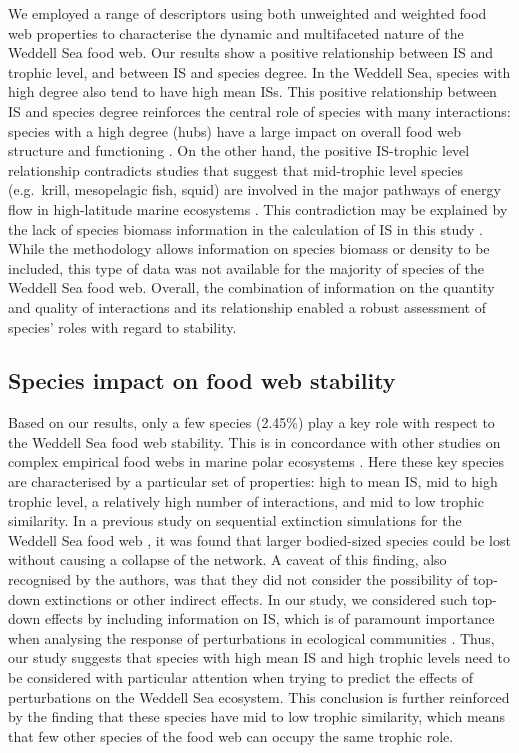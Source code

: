\documentclass[gc, manuscript]{copernicus}
\begin{document}
We employed a range of descriptors using both unweighted and weighted
food web properties to characterise the dynamic and multifaceted nature
of the Weddell Sea food web. Our results show a positive relationship
between IS and trophic level, and between IS and species degree. In the
Weddell Sea, species with high degree also tend to have high mean ISs.
This positive relationship between IS and species degree reinforces the
central role of species with many interactions: species with a high
degree (hubs) have a large impact on overall food web structure and
functioning \citep{Dunne2002a, Kortsch2015}. On the other hand, the
positive IS-trophic level relationship contradicts studies that suggest
that mid-trophic level species (e.g.~krill, mesopelagic fish, squid) are
involved in the major pathways of energy flow in high-latitude marine
ecosystems
\citep{Pinkerton2014, Murphy2016, McCormack2020, Riccialdelli2020}. This
contradiction may be explained by the lack of species biomass
information in the calculation of IS in this study \citep{Pawar2012}.
While the methodology allows information on species biomass or density
to be included, this type of data was not available for the majority of
species of the Weddell Sea food web. Overall, the combination of
information on the quantity and quality of interactions and its
relationship enabled a robust assessment of species' roles with regard
to stability.

\subsection{Species impact on food web stability}

Based on our results, only a few species (2.45\%) play a key role with
respect to the Weddell Sea food web stability. This is in concordance
with other studies on complex empirical food webs in marine polar
ecosystems \citep{Kortsch2015, Marina2018, Rodriguez2022}. Here these
key species are characterised by a particular set of properties: high to
mean IS, mid to high trophic level, a relatively high number of
interactions, and mid to low trophic similarity. In a previous study on
sequential extinction simulations for the Weddell Sea food web
\citep{Jacob2011}, it was found that larger bodied-sized species could
be lost without causing a collapse of the network. A caveat of this
finding, also recognised by the authors, was that they did not consider
the possibility of top-down extinctions or other indirect effects. In
our study, we considered such top-down effects by including information
on IS, which is of paramount importance when analysing the response of
perturbations in ecological communities
\citep{McCann1998, Montoya2009, Novak2011}. Thus, our study suggests
that species with high mean IS and high trophic levels need to be
considered with particular attention when trying to predict the effects
of perturbations on the Weddell Sea ecosystem. This conclusion is
further reinforced by the finding that these species have mid to low
trophic similarity, which means that few other species of the food web
can occupy the same trophic role.
\end{document}
